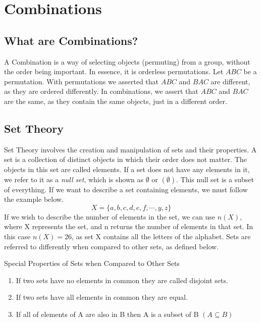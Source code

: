 \section{Combinations}

    \subsection{What are Combinations?}
     A Combination is a way of selecting objects (permuting) from a group, without the order being important.
     In essence, it is orderless permutations. Let $ABC$ be a permutation.
     With permutations we asserted that $ABC$ and $BAC$ are different, as they are ordered differently.
     In combinations, we assert that $ABC$ and $BAC$ are the same, as they contain the same objects, just in a different order.

    \subsection{Set Theory}
    Set Theory involves the creation and manipulation of sets and their properties.
    A set is a collection of distinct objects in which their order does not matter.
    The objects in this set are called elements.
    If a set does not have any elements in it, we refer to it as a \emph{null set}, which is shown as $\emptyset$ or $(\emptyset)$.
    This null set is a subset of everything.
    If we want to describe a set containing elements, we must follow the example below.
    \begin{equation*}
        X = \{a,b,c,d,e,f,\cdots,y,z\}
    \end{equation*}
    If we wish to describe the number of elements in the set, we can use $n(X)$, where X represents the set, and n returns the number of elements in that set.
    In this case $n(X) = 26$, as set X contains all the letters of the alphabet.
    Sets are referred to differently when compared to other sets, as defined below.
    \begin{definition}
    Special Properties of Sets when Compared to Other Sets
    \begin{enumerate}
        \item If two sets have no elements in common they are called disjoint sets.
        \item If two sets have all elements in common they are equal.
        \item If all of elements of A are also in B then A is a subset of B $(A\subseteq B)$
    \end{enumerate}
    \end{definition}
    
